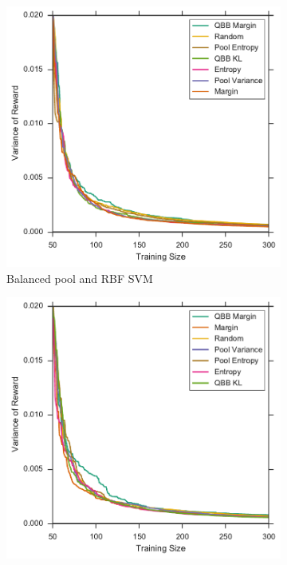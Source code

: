 \begin{figure}[p]
\begin{subfigure}{.5\textwidth}
		\includegraphics[width=\linewidth]{figures/5_thompson/sdss_br_sigmas}
		\caption{Balanced pool and RBF SVM}
		\label{fig:sdss_br_sigmas}
	\end{subfigure}
	\begin{subfigure}{.5\textwidth}
		\centering
		\includegraphics[width=\textwidth]{figures/5_thompson/sdss_ul_sigmas}

\end{subfigure}
\end{figure}
